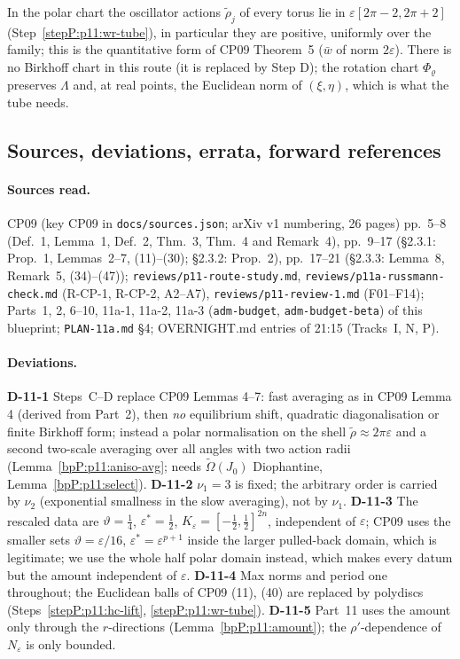 \begin{remark}\label{bpP:p11:displacement}
In the polar chart the oscillator actions $\tilde\rho_j$ of every torus lie in $\varepsilon[2\pi-2,2\pi+2]$ (Step~\ref{stepP:p11:wr-tube}), in particular they are positive, uniformly over the family; this is the quantitative form of CP09 Theorem~5 ($\bar w$ of norm $2\varepsilon$). There is no Birkhoff chart in this route (it is replaced by Step D); the rotation chart $\Phi_\varrho$ preserves $\Lambda$ and, at real points, the Euclidean norm of $(\xi,\eta)$, which is what the tube needs.
\end{remark}

\subsection{Sources, deviations, errata, forward references}\label{bpP:p11:sec-notes}

\paragraph{Sources read.} CP09 (key CP09 in \texttt{docs/sources.json}; arXiv v1 numbering, 26 pages) pp.~5--8 (Def.~1, Lemma~1, Def.~2, Thm.~3, Thm.~4 and Remark~4), pp.~9--17 (\S2.3.1: Prop.~1, Lemmas~2--7, (11)--(30); \S2.3.2: Prop.~2), pp.~17--21 (\S2.3.3: Lemma~8, Remark~5, (34)--(47)); \texttt{reviews/p11-route-study.md}, \texttt{reviews/p11a-russmann-check.md} (R-CP-1, R-CP-2, A2--A7), \texttt{reviews/p11-review-1.md} (F01--F14); Parts~1, 2, 6--10, 11a-1, 11a-2, 11a-3 (\texttt{adm-budget}, \texttt{adm-budget-beta}) of this blueprint; \texttt{PLAN-11a.md} \S4; OVERNIGHT.md entries of 21:15 (Tracks~I, N, P).

\paragraph{Deviations.} \textbf{D-11-1} Steps~C--D replace CP09 Lemmas 4--7: fast averaging as in CP09 Lemma 4 (derived from Part~2), then \emph{no} equilibrium shift, quadratic diagonalisation or finite Birkhoff form; instead a polar normalisation on the shell $\tilde\rho\approx2\pi\varepsilon$ and a second two-scale averaging over all angles with two action radii (Lemma~\ref{bpP:p11:aniso-avg}; needs $\tilde\Omega(J_0)$ Diophantine, Lemma~\ref{bpP:p11:select}). \textbf{D-11-2} $\nu_1=3$ is fixed; the arbitrary order is carried by $\nu_2$ (exponential smallness in the slow averaging), not by $\nu_1$. \textbf{D-11-3} The rescaled data are $\vartheta=\frac14$, $\varepsilon^*=\frac12$, $K_\varepsilon=[-\frac12,\frac12]^{2n}$, independent of $\varepsilon$; CP09 uses the smaller sets $\vartheta=\varepsilon/16$, $\varepsilon^*=\varepsilon^{p+1}$ inside the larger pulled-back domain, which is legitimate; we use the whole half polar domain instead, which makes every datum but the amount independent of $\varepsilon$. \textbf{D-11-4} Max norms and period one throughout; the Euclidean balls of CP09 (11), (40) are replaced by polydiscs (Steps~\ref{stepP:p11:hc-lift}, \ref{stepP:p11:wr-tube}). \textbf{D-11-5} Part~11 uses the amount only through the $r$-directions (Lemma~\ref{bpP:p11:amount}); the $\rho'$-dependence of $N_\varepsilon$ is only bounded.

